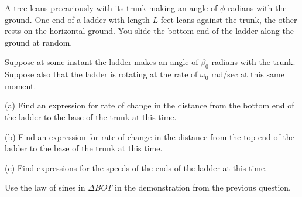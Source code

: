 \documentclass{ximera}
\begin{document}
\begin{question}  \label{Q:KNDMMD}
A tree leans precariously with its trunk making an angle of $\phi$ radians with the ground. One end of a ladder with length $L$ feet leans against the trunk, the other rests on the horizontal ground. You slide the bottom end of the ladder along the ground at random.

Suppose at some instant the ladder makes an angle of $\beta_0$ radians with the trunk. Suppose also that the ladder is  rotating at the rate of $\omega_0$ rad/sec at this same moment. 

(a) Find an expression for rate of change in the distance from the bottom end of the ladder to the base of the trunk at this time.  

(b) Find an expression for rate of change in the distance from the top end of the ladder to the base of the trunk at this time.

(c) Find expressions for the speeds of the ends of the ladder at this time.

\begin{hint}
Use the law of sines in $\Delta BOT$ in the demonstration from the previous question.
\end{hint} 


\end{question}
\end{document}
